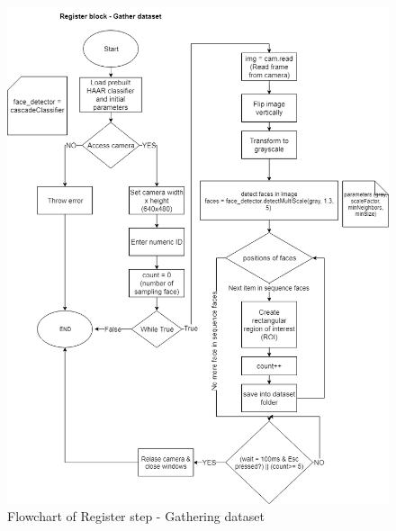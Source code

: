         \begin{figure}[!ht]
            \begin{center}
            \includegraphics[scale=0.5]{images/dataset.png}
            \caption{Flowchart of Register step - Gathering dataset}
            \label{fig:dataset}
            \end{center}
        \end{figure}
